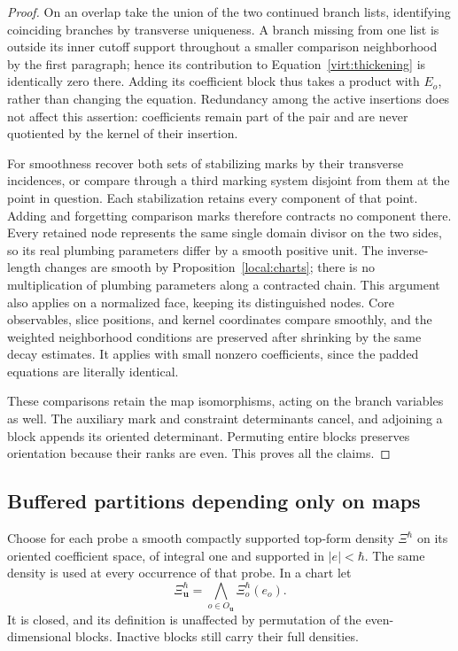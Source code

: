 \begin{proof}
On an overlap take the union of the two continued branch lists, identifying
coinciding branches by transverse uniqueness.  A branch missing from
one list is outside its inner cutoff support throughout a smaller
comparison neighborhood by the first paragraph; hence its contribution
to Equation~\eqref{virt:thickening} is identically zero there.  Adding its
coefficient block thus takes a product with $E_o$, rather than changing
the equation.  Redundancy among the active insertions does not affect
this assertion: coefficients remain part of the pair and are never
quotiented by the kernel of their insertion.

For smoothness recover both sets of stabilizing marks by their transverse
incidences, or compare through a third marking system disjoint from them
at the point in question.  Each stabilization retains every component
of that point.  Adding and forgetting comparison marks therefore
contracts no component there.  Every retained node represents the same
single domain divisor on the two sides, so its real plumbing parameters
differ by a smooth positive unit.  The inverse-length changes are smooth
by Proposition~\ref{local:charts}; there is no multiplication of plumbing
parameters along a contracted chain.  This argument also applies on a
normalized face, keeping its distinguished nodes.  Core observables,
slice positions, and kernel coordinates compare smoothly, and the
weighted neighborhood conditions are preserved after shrinking by the
same decay estimates.  It applies with small nonzero coefficients,
since the padded equations are literally identical.

These comparisons retain the map isomorphisms, acting on the branch
variables as well.  The auxiliary mark and constraint determinants
cancel, and adjoining a block appends its oriented determinant.
Permuting entire blocks preserves orientation because their ranks are
even.  This proves all the claims.
\end{proof}

\subsection{Buffered partitions depending only on maps}

Choose for each probe a smooth compactly supported top-form density
$\Xi^\hbar$ on its oriented coefficient space, of integral one and
supported in $|e|<\hbar$.  The same density is used at every occurrence
of that probe.  In a chart let
\begin{equation}\label{virt:density}
 \Xi_{\mathbf u}^\hbar
       =\bigwedge_{o\in O_{\mathbf u}}\Xi_o^\hbar(e_o).
\end{equation}
It is closed, and its definition is unaffected by permutation of the
even-dimensional blocks.  Inactive blocks still carry their full
densities.

